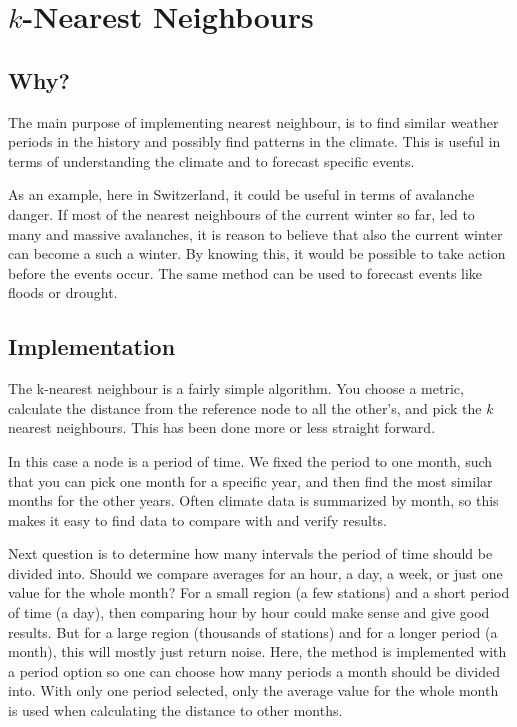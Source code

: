 \section{$k$-Nearest Neighbours}

\subsection{Why?} %

The main purpose of implementing nearest neighbour, is to find similar weather
periods in the history and possibly find patterns in the climate. This is useful
in terms of understanding the climate and to forecast specific events. 

As an example, here in Switzerland, it could be useful in terms of avalanche
danger. If most of the nearest neighbours of the current winter so far, led to
many and massive avalanches, it is reason to believe that also the current
winter can become a such a winter. By knowing this, it would be possible to take
action before the events occur. The same method can be used to forecast events
like floods or drought.  



\subsection{Implementation} %

The k-nearest neighbour is a fairly simple algorithm. You choose a metric,
calculate the distance from the reference node to all the other's, and pick the
$k$ nearest neighbours. This has been done more or less straight forward.

In this case a node is a period of time. We fixed the period to one month, such
that you can pick one month for a specific year, and then find the most similar
months for the other years. Often climate data is summarized by month, so this
makes it easy to find data to compare with and verify results.

Next question is to determine how many intervals the period of time should be
divided into. Should we compare averages for an hour, a day, a week, or just one
value for the whole month? For a small region (a few stations) and a short
period of time (a day), then comparing hour by hour could make sense and give
good results. But for a large region (thousands of stations) and for a longer
period (a month), this will mostly just return noise. Here, the method is
implemented with a period option so one can choose how many periods a month
should be divided into. With only one period selected, only the average value
for the whole month is used when calculating the distance to other months.

